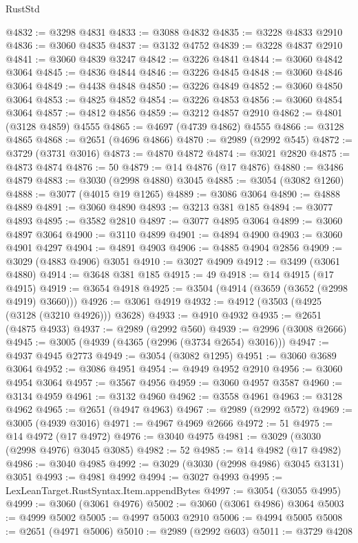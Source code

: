 \begin{lexlean}{RustStd}
\begin{coremodule}
@4832 := @3298 @4831
@4833 := @3088 @4832
@4835 := @3228 @4833 @2910
@4836 := @3060 @4835
@4837 := @3132 @4752
@4839 := @3228 @4837 @2910
@4841 := @3060 @4839 @3247
@4842 := @3226 @4841
@4844 := @3060 @4842 @3064
@4845 := @4836 @4844
@4846 := @3226 @4845
@4848 := @3060 @4846 @3064
@4849 := @4438 @4848
@4850 := @3226 @4849
@4852 := @3060 @4850 @3064
@4853 := @4825 @4852
@4854 := @3226 @4853
@4856 := @3060 @4854 @3064
@4857 := @4812 @4856
@4859 := @3212 @4857 @2910
@4862 := @4801 (@3128 @4859) @4555
@4865 := @4697 (@4739 @4862) @4555
@4866 := @3128 @4865
@4868 := @2651 (@4696 @4866)
@4870 := @2989 (@2992 @545)
@4872 := @3729 (@3731 @3016)
@4873 := @4870 @4872
@4874 := @3021 @2820
@4875 := @4873 @4874
@4876 := 50
@4879 := @14 @4876 (@17 @4876)
@4880 := @3486 @4879
@4883 := @3030 (@2998 @4880) @3045
@4885 := @3054 (@3082 @1260)
@4888 := @3077 (@4015 @19 @1265)
@4889 := @3086 @3064
@4890 := @4888 @4889
@4891 := @3060 @4890
@4893 := @3213 @381 @185
@4894 := @3077 @4893
@4895 := @3582 @2810
@4897 := @3077 @4895 @3064
@4899 := @3060 @4897 @3064
@4900 := @3110 @4899
@4901 := @4894 @4900
@4903 := @3060 @4901 @4297
@4904 := @4891 @4903
@4906 := @4885 @4904 @2856
@4909 := @3029 (@4883 @4906) @3051
@4910 := @3027 @4909
@4912 := @3499 (@3061 @4880)
@4914 := @3648 @381 @185
@4915 := 49
@4918 := @14 @4915 (@17 @4915)
@4919 := @3654 @4918
@4925 := @3504 (@4914 (@3659 (@3652 (@2998 @4919) @3660)))
@4926 := @3061 @4919
@4932 := @4912 (@3503 (@4925 (@3128 (@3210 @4926))) @3628)
@4933 := @4910 @4932
@4935 := @2651 (@4875 @4933)
@4937 := @2989 (@2992 @560)
@4939 := @2996 (@3008 @2666)
@4945 := @3005 (@4939 (@4365 (@2996 (@3734 @2654) @3016)))
@4947 := @4937 @4945 @2773
@4949 := @3054 (@3082 @1295)
@4951 := @3060 @3689 @3064
@4952 := @3086 @4951
@4954 := @4949 @4952 @2910
@4956 := @3060 @4954 @3064
@4957 := @3567 @4956
@4959 := @3060 @4957 @3587
@4960 := @3134 @4959
@4961 := @3132 @4960
@4962 := @3558 @4961
@4963 := @3128 @4962
@4965 := @2651 (@4947 @4963)
@4967 := @2989 (@2992 @572)
@4969 := @3005 (@4939 @3016)
@4971 := @4967 @4969 @2666
@4972 := 51
@4975 := @14 @4972 (@17 @4972)
@4976 := @3040 @4975
@4981 := @3029 (@3030 (@2998 @4976) @3045 @3085)
@4982 := 52
@4985 := @14 @4982 (@17 @4982)
@4986 := @3040 @4985
@4992 := @3029 (@3030 (@2998 @4986) @3045 @3131) @3051
@4993 := @4981 @4992
@4994 := @3027 @4993
@4995 := LexLeanTarget.RustSyntax.Item.appendBytes
@4997 := @3054 (@3055 @4995)
@4999 := @3060 (@3061 @4976)
@5002 := @3060 (@3061 @4986) @3064
@5003 := @4999 @5002
@5005 := @4997 @5003 @2910
@5006 := @4994 @5005
@5008 := @2651 (@4971 @5006)
@5010 := @2989 (@2992 @603)
@5011 := @3729 @4208

\end{coremodule}
\end{lexlean}
